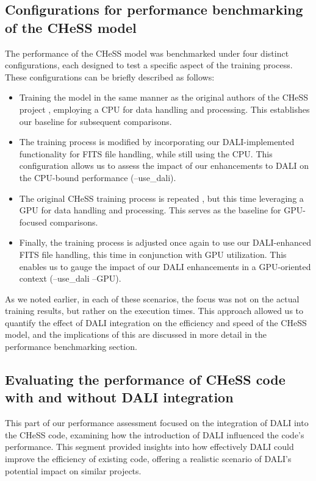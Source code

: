 \documentclass[licencjacka,en]{pracamgr}
\begin{document}
\subsection{Configurations for performance benchmarking of the CHeSS model}

The performance of the CHeSS model was benchmarked under four distinct configurations, each designed to test a specific aspect of the training process. These configurations can be briefly described as follows:
\begin{itemize}
    \item Training the model in the same manner as the original authors of the CHeSS project \cite{CHeSS}, employing a CPU for data handling and processing. This establishes our baseline for subsequent comparisons.
    \item The training process is modified by incorporating our DALI-implemented functionality for FITS file handling, while still using the CPU. This configuration allows us to assess the impact of our enhancements to DALI on the CPU-bound performance (--use\_dali).
    \item The original CHeSS training process is repeated \cite{CHeSS}, but this time leveraging a GPU for data handling and processing. This serves as the baseline for GPU-focused comparisons.
    \item Finally, the training process is adjusted once again to use our DALI-enhanced FITS file handling, this time in conjunction with GPU utilization. This enables us to gauge the impact of our DALI enhancements in a GPU-oriented context (--use\_dali --GPU).
\end{itemize}
    

As we noted earlier, in each of these scenarios, the focus was not on the actual training results, but rather on the execution times. This approach allowed us to quantify the effect of DALI integration on the efficiency and speed of the CHeSS model, and the implications of this are discussed in more detail in the performance benchmarking section.



\subsection{Evaluating the performance of CHeSS code with and without DALI integration}

This part of our performance assessment focused on the integration of DALI into the CHeSS code, examining how the introduction of DALI influenced the code's performance. This segment provided insights into how effectively DALI could improve the efficiency of existing code, offering a realistic scenario of DALI's potential impact on similar projects.
\end{document}
